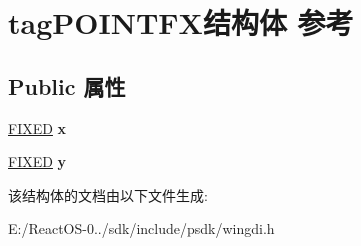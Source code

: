 \hypertarget{structtag_p_o_i_n_t_f_x}{}\section{tag\+P\+O\+I\+N\+T\+F\+X结构体 参考}
\label{structtag_p_o_i_n_t_f_x}
\subsection*{Public 属性}
\begin{DoxyCompactItemize}
\item 
\mbox{\label{structtag_p_o_i_n_t_f_x_aadcbef5a5dd9e9f7e7fed4d37647c8c3}} 
\hyperlink{struct___f_i_x_e_d}{F\+I\+X\+ED} {\bfseries x}
\item 
\mbox{\label{structtag_p_o_i_n_t_f_x_a80223a80cba859333ea3d35147a55c57}} 
\hyperlink{struct___f_i_x_e_d}{F\+I\+X\+ED} {\bfseries y}
\end{DoxyCompactItemize}


该结构体的文档由以下文件生成\+:\begin{DoxyCompactItemize}
\item 
E\+:/\+React\+O\+S-\/0../sdk/include/psdk/wingdi.\+h\end{DoxyCompactItemize}
